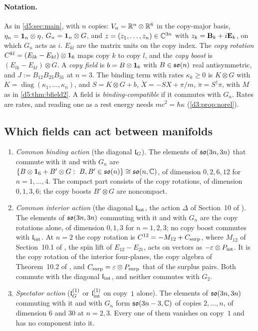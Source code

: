\paragraph{Notation.} As in \cref{d5:sec:main}, with $n$ copies: $V_n=\mathbb{R}^n\otimes\mathbb{R}^6$ in the copy-major basis, $\eta_n=\mathbf 1_n\otimes\eta$,
$G_n=\mathbf 1_n\otimes G$, and $z=(z_1,\dots,z_n)\in\mathbb{C}^{3n}$ with $z_k=\mathbf B_k+i\mathbf E_k$, on which $G_n$ acts as $i$. $E_{kl}$ are the matrix units on the copy
index. The \emph{copy rotation} $C^{kl}=(E_{lk}-E_{kl})\otimes\mathbf 1_6$ maps copy $k$ to copy $l$, and the \emph{copy boost} is $(E_{lk}-E_{kl})\otimes G$. A
\emph{copy field} is $b=B\otimes\mathbf 1_6$ with $B\in\mathfrak{so}(n)$ real antisymmetric, and $J:=B_{12}B_{23}B_{31}$ at $n=3$. The binding term with
rates $\kappa_k\ge0$ is $K\otimes G$ with $K=\operatorname{diag}(\kappa_1,\dots,\kappa_n)$, and $S=K\otimes G+b$, $\dot X=-SX+\pi/m$, $\dot\pi=S^\dagger\pi$, with
$M$ as in \cref{d5:thm:bfield2}. A field is \emph{binding-compatible} if it commutes with $G_n$. Rates are rates, and reading one as a rest
energy needs $mc^2=\hbar\kappa$ (\cref{d3:prop:norel}).

\subsection{Which fields can act between manifolds}
\label{d7:sec:exist}

\begin{proposition}
\label{d7:prop:exist}
\begin{enumerate}[label=(\roman*),leftmargin=2.2em]
\item \emph{Common binding action} (the diagonal $\mathfrak l_G$). The elements of $\mathfrak{so}(3n,3n)$ that commute with it and with $G_n$ are
$\{B\otimes\mathbf 1_6+B'\otimes G:\ B,B'\in\mathfrak{so}(n)\}\cong\mathfrak{so}(n,\mathbb{C})$, of dimension $0,2,6,12$ for $n=1,\dots,4$. The compact part consists of the copy
rotations, of dimension $0,1,3,6$; the copy boosts $B'\otimes G$ are noncompact.
\item \emph{Common interior action} (the diagonal $\mathfrak l_{\rm int}$, the action $\Delta$ of Section~10 of \cite{ES17}). The elements of
$\mathfrak{so}(3n,3n)$ commuting with it and with $G_n$ are the copy rotations alone, of dimension $0,1,3$ for $n=1,2,3$; no copy boost commutes with $\mathfrak l_{\rm int}$.
At $n=2$ the copy rotation is $C^{12}=-M_{12}+C_{\rm surp}$, where $M_{12}$ of Section~10.1 of \cite{ES17}, the spin lift of $E_{12}-E_{21}$, acts on vectors as $-\varepsilon\otimes P_{\rm int}$. It is the copy rotation of the interior
four-planes, the copy algebra of Theorem~10.2 of \cite{ES17}, and $C_{\rm surp}=\varepsilon\otimes P_{\rm surp}$ that of the surplus pairs. Both
commute with the diagonal $\mathfrak l_{\rm int}$, and neither commutes with $G_2$.
\item \emph{Spectator action} ($\mathfrak l_G^{(1)}$ or $\mathfrak l_{\rm int}^{(1)}$ on copy~$1$ alone). The elements of $\mathfrak{so}(3n,3n)$ commuting with it and with $G_n$ form
$\mathfrak{so}(3n-3,\mathbb{C})$ of copies $2,\dots,n$, of dimension $6$ and $30$ at $n=2,3$. Every one of them vanishes on copy~$1$ and has no component into it.
\end{enumerate}
\end{proposition}

